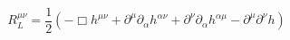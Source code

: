 \begin{equation}
 R^{\mu\nu}_L = \frac{1}{2}(- \Box h^{\mu\nu} + \partial^\mu \partial_\alpha  h^{\alpha \nu} + \partial^\nu\partial_\alpha  h^{\alpha \mu} - \partial^\mu \partial^\nu h)
\label{45}
\end{equation}

